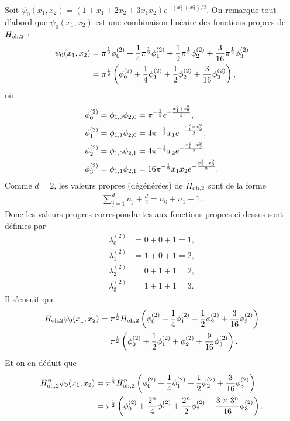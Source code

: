 Soit $\psi_0(x_1,x_2) = (1 + x_1 + 2x_2 + 3x_1 x_2)
e^{-(x_1^2 + x_2^2) / 2}$. On remarque tout d'abord que
$\psi_0(x_1,x_2)$ est une combinaison linéaire des fonctions
propres de $H_\text{oh,2}$ :
\begin{align}
    \psi_0(x_1,x_2)
    &= \pi^\ud \phi_0^{(2)}
    + \frac{1}{4} \pi^\ud \phi_1^{(2)}
    + \frac{1}{2} \pi^\ud \phi_2^{(2)}
    + \frac{3}{16} \pi^\ud \phi_3^{(2)} \\
%
    &= \pi^\ud \left( \phi_0^{(2)}
    + \frac{1}{4} \phi_1^{(2)}
    + \frac{1}{2} \phi_2^{(2)}
    + \frac{3}{16} \phi_3^{(2)} \right),
\end{align}
%
où
\begin{align}
    \phi_0^{(2)} = \phi_{1,0}\phi_{2,0}
    &= \pi^{-\frac{1}{2}} e^{-\frac{x_1^2 + x_2^2}{2}}, \\
    \phi_1^{(2)} = \phi_{1,1}\phi_{2,0}
    &= 4 \pi^{-\frac{1}{2}} x_1 e^{-\frac{x_1^2 + x_2^2}{2}}, \\
    \phi_2^{(2)} = \phi_{1,0}\phi_{2,1}
    &= 4 \pi^{-\frac{1}{2}} x_2 e^{-\frac{x_1^2 + x_2^2}{2}}, \\
    \phi_3^{(2)} = \phi_{1,1}\phi_{2,1}
    &= 16 \pi^{-\frac{1}{2}} x_1 x_2 e^{-\frac{x_1^2 + x_2^2}{2}}.
\end{align}
%
Comme $d = 2$, les valeurs propres (dégénérées) de $H_\text{oh,2}$ sont de
la forme
\begin{align}
    \sum_{j=1}^d n_j + \frac{d}{2} = n_0 + n_1 + 1.
\end{align}
%
Donc les valeurs propres correspondantes aux fonctions
propres ci-dessus sont définies par
\begin{align}
    \lambda_0^{(2)} &= 0 + 0 + 1 = 1, \\
    \lambda_1^{(2)} &= 1 + 0 + 1 = 2, \\
    \lambda_2^{(2)} &= 0 + 1 + 1 = 2, \\
    \lambda_3^{(2)} &= 1 + 1 + 1 = 3.
\end{align}
%
Il s'ensuit que
\begin{align}
    \hodd{2} \psi_0(x_1,x_2)
    &= \pi^\ud \hodd{2} \left( \phi_0^{(2)}
    + \frac{1}{4} \phi_1^{(2)}
    + \frac{1}{2} \phi_2^{(2)}
    + \frac{3}{16} \phi_3^{(2)} \right) \\
%
    &= \pi^\ud \left( \phi_0^{(2)}
    + \frac{1}{2} \phi_1^{(2)}
    + \phi_2^{(2)}
    + \frac{9}{16} \phi_3^{(2)} \right).
\end{align}
%
Et on en déduit que
\begin{align}
    \hodd{2}^n \psi_0(x_1,x_2)
    &= \pi^\ud \hodd{2}^n \left( \phi_0^{(2)}
    + \frac{1}{4} \phi_1^{(2)}
    + \frac{1}{2} \phi_2^{(2)}
    + \frac{3}{16} \phi_3^{(2)} \right) \\
%
    &= \pi^\ud \left( \phi_0^{(2)}
    + \frac{2^n}{4} \phi_1^{(2)}
    + \frac{2^n}{2} \phi_2^{(2)}
    + \frac{3 \times 3^n}{16} \phi_3^{(2)} \right).
\end{align}
